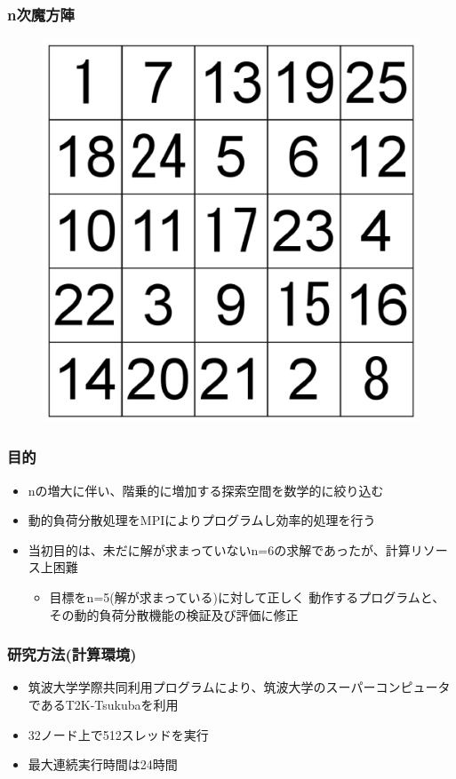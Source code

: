 \documentclass[dvipdfmx,20pt,notheorems,t]{beamer}
\begin{document}
\begin{frame}\frametitle{n次魔方陣}
\begin{figure}[htb]
\centering
\includegraphics[height=0.6\textheight]{ms.eps}
\end{figure}
\end{frame}

\begin{frame}\frametitle{目的}
\begin{itemize}
\item nの増大に伴い、階乗的に増加する探索空間を数学的に絞り込む
\item 動的負荷分散処理をMPIによりプログラムし効率的処理を行う
\item 当初目的は、未だに解が求まっていないn=6の求解であったが、計算リソース上困難
\begin{itemize}
\item 目標をn=5(解が求まっている)に対して正しく 動作するプログラムと、その動的負荷分散機能の検証及び評価に修正
\end{itemize}
\end{itemize}
\end{frame}

\begin{frame}\frametitle{研究方法(計算環境)}
\begin{itemize}
\item 筑波大学学際共同利用プログラムにより、筑波大学のスーパーコンピュータであるT2K-Tsukubaを利用
\item 32ノード上で512スレッドを実行
\item 最大連続実行時間は24時間
\end{itemize}
\end{frame}
\end{document}
